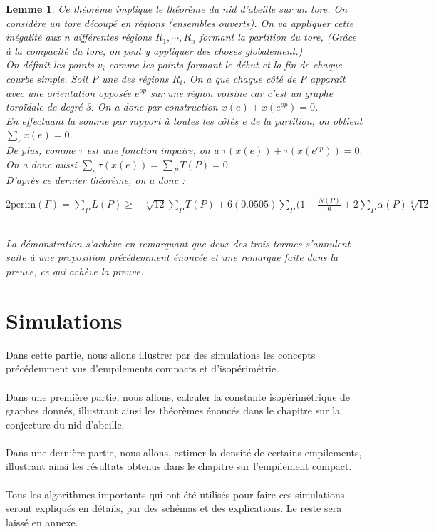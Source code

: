 \documentclass{book}
\newtheorem{lemma}{Lemme}
\begin{document}
\begin{lemma}
Ce théorème implique le théorème du nid d'abeille sur un tore. On considère un tore découpé en régions (ensembles ouverts). On va appliquer cette inégalité aux n différentes régions $R_1, \cdots, R_n$ formant la partition du tore, (Grâce à la compacité du tore, on peut y appliquer des choses globalement.)\\

On définit les points $v_i$ comme les points formant le début et la fin de chaque courbe simple. Soit P une des régions $R_i$. On a que chaque côté de P apparaît avec une orientation opposée $e^{op}$ sur une région voisine car c'est un graphe toroïdale de degré 3. On a donc par construction $x(e) + x(e^{op}) = 0$.\\
En effectuant la somme par rapport à toutes les côtés e de la partition, on obtient $\underset{e}{\sum} x(e) = 0$.\\
De plus, comme $\tau$ est une fonction impaire, on a $\tau(x(e)) + \tau(x(e^{op})) = 0.$\\
On a donc aussi $\underset{e}{\sum} \tau (x(e)) = \underset{P}{\sum} T(P) = 0.$\\
D'après ce dernier théorème, on a donc : \\
\centerline{$ 2 \text{perim} (\Gamma) = \underset{P}{\sum} L(P) \geq - \sqrt[4]{12} \underset{P}{\sum} T(P) +6(0.0505) \underset{P}{\sum} (1- \frac{N(P)}{6} + 2 \underset{P}{\sum} \alpha (P) \sqrt[4]{12}$}\\
La démonstration s'achève en remarquant que deux des trois termes s'annulent suite à une proposition précédemment énoncée et une remarque faite dans la preuve, ce qui achève la preuve.
\end{lemma}
\chapter{Simulations}

Dans cette partie, nous allons illustrer par des simulations les concepts précédemment vus d'empilements compacts et d'isopérimétrie.\\\\
Dans une première partie, nous allons, calculer la constante isopérimétrique de graphes donnés, illustrant ainsi les théorèmes énoncés dans le chapitre sur la conjecture du nid d'abeille. \\\\
Dans une dernière partie, nous allons, estimer la densité de certains empilements, illustrant ainsi les résultats obtenus dans le chapitre sur l'empilement compact.\\\\
Tous les algorithmes importants qui ont été utilisés pour faire ces simulations seront expliqués en détails, par des schémas et des explications. Le reste sera laissé en annexe.
\end{document}
